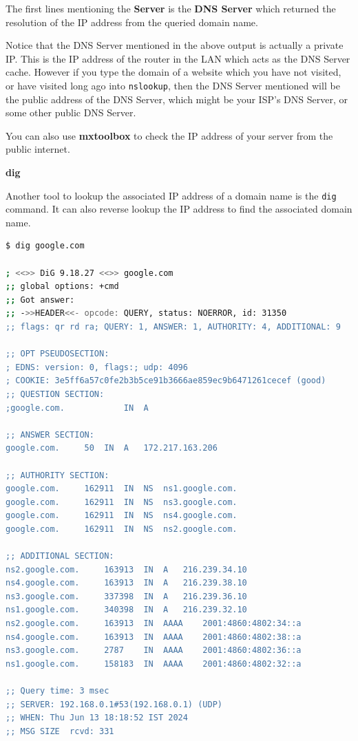 The first lines mentioning the \textbf{Server}
is the \textbf{DNS Server} which returned the
resolution of the IP address from the queried
domain name.

\begin{remark}
  Notice that the DNS Server mentioned in the above
  output is actually a private IP. This is the IP
  address of the router in the LAN which acts as
  the DNS Server cache. However if you type the
  domain of a website which you have not visited,
  or have visited long ago into \lstinline|nslookup|,
  then the DNS Server mentioned will be the public
  address of the DNS Server, which might be your
  ISP's DNS Server, or some other public DNS Server.
\end{remark}

You can also use \textbf{mxtoolbox} to check the
IP address of your server from the public internet.

\textbf{dig}

Another tool to lookup the associated IP address of
a domain name is the \lstinline|dig| command.
It can also reverse lookup the IP address to find
the associated domain name.

\begin{lstlisting}[language=bash, basicstyle=\scriptsize\ttfamily]
$ dig google.com

; <<>> DiG 9.18.27 <<>> google.com
;; global options: +cmd
;; Got answer:
;; ->>HEADER<<- opcode: QUERY, status: NOERROR, id: 31350
;; flags: qr rd ra; QUERY: 1, ANSWER: 1, AUTHORITY: 4, ADDITIONAL: 9

;; OPT PSEUDOSECTION:
; EDNS: version: 0, flags:; udp: 4096
; COOKIE: 3e5ff6a57c0fe2b3b5ce91b3666ae859ec9b6471261cecef (good)
;; QUESTION SECTION:
;google.com.			IN	A

;; ANSWER SECTION:
google.com.		50	IN	A	172.217.163.206

;; AUTHORITY SECTION:
google.com.		162911	IN	NS	ns1.google.com.
google.com.		162911	IN	NS	ns3.google.com.
google.com.		162911	IN	NS	ns4.google.com.
google.com.		162911	IN	NS	ns2.google.com.

;; ADDITIONAL SECTION:
ns2.google.com.		163913	IN	A	216.239.34.10
ns4.google.com.		163913	IN	A	216.239.38.10
ns3.google.com.		337398	IN	A	216.239.36.10
ns1.google.com.		340398	IN	A	216.239.32.10
ns2.google.com.		163913	IN	AAAA	2001:4860:4802:34::a
ns4.google.com.		163913	IN	AAAA	2001:4860:4802:38::a
ns3.google.com.		2787	IN	AAAA	2001:4860:4802:36::a
ns1.google.com.		158183	IN	AAAA	2001:4860:4802:32::a

;; Query time: 3 msec
;; SERVER: 192.168.0.1#53(192.168.0.1) (UDP)
;; WHEN: Thu Jun 13 18:18:52 IST 2024
;; MSG SIZE  rcvd: 331
\end{lstlisting}

